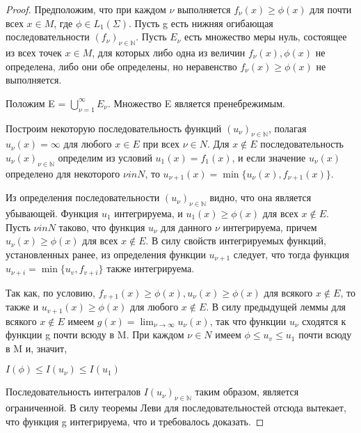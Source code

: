 \documentclass[a4paper]{article}
\theoremstyle{definition}
\theoremstyle{remark}
\begin{document}
     \begin{proof}
          Предположим, что при каждом $\nu$ выполняется 
          $f_\nu(x)\geq \phi(x)$ для почти всех $x\in M$, где $\phi \in L_1(\Sigma)$. Пусть g есть 
          нижняя огибающая последовательности $(f_\nu)_{\nu\in \mathbb{N}}$. Пусть $E_\nu$ есть  
          множество меры нуль, состоящее из всех точек $x\in M$, для которых либо 
          одна из величин $f_\nu(x), \phi(x)$ не определена, либо они обе определены, 
          но неравенство $f_\nu(x) \geq \phi(x)$ не выполняется. 
          
          Положим E = $\bigcup_{\nu = 1}^\infty E_\nu$.
          Множество E является пренебрежимым.

          Построим некоторую последовательность функций $(u_\nu)_{\nu\in \mathbb{N}}$,  
          полагая $u_\nu(x) = \infty$ для любого $x\in E$ при всех $\nu \in N$. Для $x\notin E$ 
          последовательность $u_\nu(x)_{\nu\in \mathbb{N}}$ определим из условий $u_1(x) = f_1(x)$, 
          и если значение $u_\nu(x)$ определено для некоторого $\nu in N$, то 
          $u_{\nu+1}(x) = \min\{u_\nu(x), f_{\nu+1}(x)\}. $

          Из определения последовательности $(u_\nu)_{\nu\in \mathbb{N}}$ видно, что она  
          является убывающей. Функция $u_1$ интегрируема, и $u_1(x) \geq \phi(x)$ для всех 
          $x\notin E$. Пусть $\nu in N$ таково, что функция $u_\nu$ для данного $\nu$
          интегрируема, причем $u_\nu(x) \geq \phi(x)$ для всех $x\notin E$. В силу свойств  
          интегрируемых функций, установленных ранее, из определения 
          функции $u_{\nu + 1}$ следует, что тогда функция $u_{\nu+i} = \min\{u_v, f_{v+i}\}$ 
          также интегрируема. 
          
          Так как, по условию, $f_{v+1}(x) \geq\phi(x), u_\nu(x) \geq \phi(x)$ для всякого 
          $x\notin E$, то также и $u_{v+1}(x) \geq \phi(x)$ для любого $x\notin E$. 
          В силу предыдущей леммы для всякого $x\notin E$ имеем $g(x) = \lim_{\nu\to \infty} u_\nu(x)$, так 
          что функции $u_\nu$ сходятся к функции g почти всюду в M. При каждом 
          $\nu \in N$ имеем $\phi \leq u_v \leq u_1$ почти всюду в M и, значит,

          $I(\phi)\leq I(u_\nu)\leq I(u_1)$ 

          Последовательность интегралов $I(u_\nu)_{\nu\in \mathbb{N}}$ таким образом,  
          является ограниченной. В силу теоремы Леви для последовательностей 
          отсюда вытекает, что функция g 
          интегрируема, что и требовалось доказать. 


\end{proof}
\end{document}

